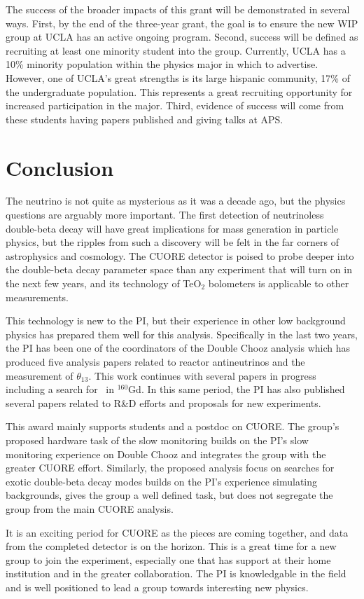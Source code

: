 The success of the broader impacts of this grant will be demonstrated in several ways.   First, by the end of the three-year grant, the goal is to ensure the new WIP group at UCLA has an active ongoing program.  Second, success will be defined as recruiting at least one minority student into the group. Currently, UCLA has a 10\% minority population within the physics major in which to advertise. However, one of UCLA's great strengths is its large hispanic community, 17\% of the undergraduate population. This represents a great recruiting opportunity for increased participation in the major. Third, evidence of success will come from these students having papers published and giving talks at APS. 

\section{Conclusion}
The neutrino is not quite as mysterious as it was a decade ago, but the physics questions are arguably more important. The first detection of neutrinoless double-beta decay will have great implications for mass generation in particle physics, but the ripples from such a discovery will be felt in the far corners of astrophysics and cosmology. The CUORE  detector is poised to probe deeper into the double-beta decay parameter space than any experiment that will turn on in the next few years, and its technology of TeO$_2$ bolometers is applicable to other measurements.

This technology is new to the PI, but their experience in other low background physics has prepared them well for this analysis. Specifically in the last two years, the PI has been one of the coordinators of the Double Chooz  analysis which has produced five analysis papers related to reactor antineutrinos and the measurement of $\theta_{13}$\cite{dcone, dctwo, takahama,Abe:2012gw,Abe:2012ar}. This work continues with several papers in progress including a search for \zeronu~in $^{160}$Gd. In this same period, the PI has also published several papers related to R\&D efforts and proposals for new experiments\cite{Alonso:2010fs,isodar,qdot,Lopez201222}.

This award mainly supports students and a postdoc on CUORE. The group's proposed hardware task of the slow monitoring builds on the PI's slow monitoring experience on Double Chooz and integrates the group with the greater CUORE effort. Similarly, the proposed analysis focus on searches for exotic double-beta decay modes builds on the PI's experience simulating backgrounds, gives the group a well defined task, but does not segregate the group from the main CUORE analysis. 

It is an exciting period for CUORE as the pieces are coming together, and data from the completed detector is on the horizon. This is a great time for a new group to join the experiment, especially one that has support at their home institution and in the greater collaboration. The PI is knowledgable in the field and is well positioned to lead a group towards interesting new physics. 
